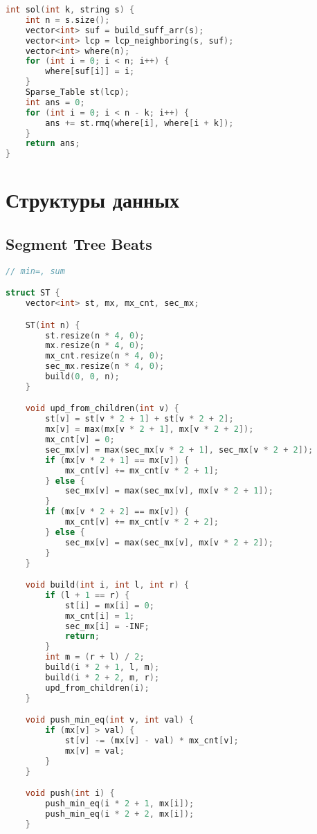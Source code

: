 \documentclass[10pt,a4paper,landscape,twosided]{extarticle}
\begin{document}
\begin{multicols}{3}
\begin{lstlisting}[language=C++]
int sol(int k, string s) {
    int n = s.size();
    vector<int> suf = build_suff_arr(s);
    vector<int> lcp = lcp_neighboring(s, suf);
    vector<int> where(n);
    for (int i = 0; i < n; i++) {
        where[suf[i]] = i;
    }
    Sparse_Table st(lcp);
    int ans = 0;
    for (int i = 0; i < n - k; i++) {
        ans += st.rmq(where[i], where[i + k]);
    }
    return ans;
}

\end{lstlisting}

\section{Структуры данных}

\subsection{Segment Tree Beats}
\begin{lstlisting}[language=C++]
// min=, sum

struct ST {
    vector<int> st, mx, mx_cnt, sec_mx;

    ST(int n) {
        st.resize(n * 4, 0);
        mx.resize(n * 4, 0);
        mx_cnt.resize(n * 4, 0);
        sec_mx.resize(n * 4, 0);
        build(0, 0, n);
    }

    void upd_from_children(int v) {
        st[v] = st[v * 2 + 1] + st[v * 2 + 2];
        mx[v] = max(mx[v * 2 + 1], mx[v * 2 + 2]);
        mx_cnt[v] = 0;
        sec_mx[v] = max(sec_mx[v * 2 + 1], sec_mx[v * 2 + 2]);
        if (mx[v * 2 + 1] == mx[v]) {
            mx_cnt[v] += mx_cnt[v * 2 + 1];
        } else {
            sec_mx[v] = max(sec_mx[v], mx[v * 2 + 1]);
        }
        if (mx[v * 2 + 2] == mx[v]) {
            mx_cnt[v] += mx_cnt[v * 2 + 2];
        } else {
            sec_mx[v] = max(sec_mx[v], mx[v * 2 + 2]);
        }
    }

    void build(int i, int l, int r) {
        if (l + 1 == r) {
            st[i] = mx[i] = 0;
            mx_cnt[i] = 1;
            sec_mx[i] = -INF;
            return;
        }
        int m = (r + l) / 2;
        build(i * 2 + 1, l, m);
        build(i * 2 + 2, m, r);
        upd_from_children(i);
    }

    void push_min_eq(int v, int val) {
        if (mx[v] > val) {
            st[v] -= (mx[v] - val) * mx_cnt[v];
            mx[v] = val;
        }
    }

    void push(int i) {
        push_min_eq(i * 2 + 1, mx[i]);
        push_min_eq(i * 2 + 2, mx[i]);
    }


\end{lstlisting}
\end{multicols}
\end{document}
